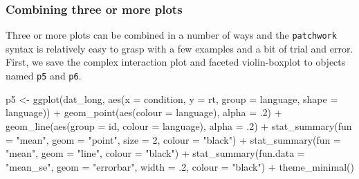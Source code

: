 \documentclass[
  english,
  doc,floatsintext]{apa6}
\newenvironment{Shaded}{\begin{snugshade}}{\end{snugshade}}
\newcommand{\AttributeTok}[1]{\textcolor[rgb]{0.77,0.63,0.00}{#1}}
\newcommand{\DecValTok}[1]{\textcolor[rgb]{0.00,0.00,0.81}{#1}}
\newcommand{\FunctionTok}[1]{\textcolor[rgb]{0.00,0.00,0.00}{#1}}
\newcommand{\NormalTok}[1]{#1}
\newcommand{\OtherTok}[1]{\textcolor[rgb]{0.56,0.35,0.01}{#1}}
\newcommand{\SpecialCharTok}[1]{\textcolor[rgb]{0.00,0.00,0.00}{#1}}
\newcommand{\StringTok}[1]{\textcolor[rgb]{0.31,0.60,0.02}{#1}}
\begin{document}
\hypertarget{combining-three-or-more-plots}{%
\subsubsection{Combining three or more plots}\label{combining-three-or-more-plots}}

Three or more plots can be combined in a number of ways and the \texttt{patchwork} syntax is relatively easy to grasp with a few examples and a bit of trial and error. First, we save the complex interaction plot and faceted violin-boxplot to objects named \texttt{p5} and \texttt{p6}.

\begin{Shaded}
\begin{Highlighting}[]
\NormalTok{p5 }\OtherTok{\textless{}{-}} \FunctionTok{ggplot}\NormalTok{(dat\_long, }\FunctionTok{aes}\NormalTok{(}\AttributeTok{x =}\NormalTok{ condition, }\AttributeTok{y =}\NormalTok{ rt, }
                           \AttributeTok{group =}\NormalTok{ language, }
                           \AttributeTok{shape =}\NormalTok{ language)) }\SpecialCharTok{+}
  \FunctionTok{geom\_point}\NormalTok{(}\FunctionTok{aes}\NormalTok{(}\AttributeTok{colour =}\NormalTok{ language),}
             \AttributeTok{alpha =}\NormalTok{ .}\DecValTok{2}\NormalTok{) }\SpecialCharTok{+}
  \FunctionTok{geom\_line}\NormalTok{(}\FunctionTok{aes}\NormalTok{(}\AttributeTok{group =}\NormalTok{ id, }\AttributeTok{colour =}\NormalTok{ language), }
            \AttributeTok{alpha =}\NormalTok{ .}\DecValTok{2}\NormalTok{) }\SpecialCharTok{+}
  \FunctionTok{stat\_summary}\NormalTok{(}\AttributeTok{fun =} \StringTok{"mean"}\NormalTok{, }
               \AttributeTok{geom =} \StringTok{"point"}\NormalTok{, }
               \AttributeTok{size =} \DecValTok{2}\NormalTok{, }
               \AttributeTok{colour =} \StringTok{"black"}\NormalTok{) }\SpecialCharTok{+}
  \FunctionTok{stat\_summary}\NormalTok{(}\AttributeTok{fun =} \StringTok{"mean"}\NormalTok{, }
               \AttributeTok{geom =} \StringTok{"line"}\NormalTok{, }
               \AttributeTok{colour =} \StringTok{"black"}\NormalTok{) }\SpecialCharTok{+}
  \FunctionTok{stat\_summary}\NormalTok{(}\AttributeTok{fun.data =} \StringTok{"mean\_se"}\NormalTok{, }
               \AttributeTok{geom =} \StringTok{"errorbar"}\NormalTok{, }
               \AttributeTok{width =}\NormalTok{ .}\DecValTok{2}\NormalTok{, }
               \AttributeTok{colour =} \StringTok{"black"}\NormalTok{) }\SpecialCharTok{+}
  \FunctionTok{theme\_minimal}\NormalTok{()}


\end{Highlighting}
\end{Shaded}
\end{document}
